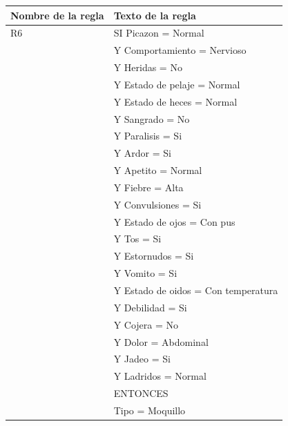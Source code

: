 \documentclass[a4paper,table,xcdraw]{article}
\begin{document}
\begin{table}[H]
\centering
\begin{tabular}{|l|l|}
\hline
\textbf{Nombre de la regla} & Texto de la regla \\ \hline
R6 & SI Picazon = Normal \\
  & Y Comportamiento = Nervioso \\
  & Y Heridas = No \\
  & Y Estado de pelaje = Normal \\
  & Y Estado de heces = Normal \\
  & Y Sangrado = No \\
  & Y Paralisis = Si \\
  & Y Ardor = Si \\
  & Y Apetito = Normal \\
  & Y Fiebre = Alta \\
  & Y Convulsiones = Si \\
  & Y Estado de ojos = Con pus \\
  & Y Tos = Si \\
  & Y Estornudos = Si \\
  & Y Vomito = Si \\
  & Y Estado de oidos = Con temperatura \\
  & Y Debilidad = Si \\
  & Y Cojera = No \\
  & Y Dolor = Abdominal \\
  & Y Jadeo = Si \\
  & Y Ladridos = Normal \\
  &   ENTONCES \\
  & Tipo = Moquillo \\ \hline
\end{tabular}
\end{table}
  
\end{document}
